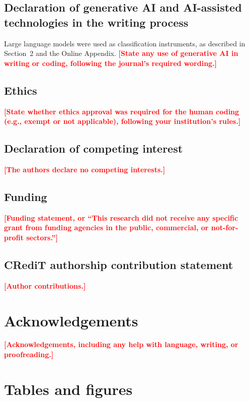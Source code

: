 \documentclass[12pt]{article}
\newcommand{\chk}[1]{\textcolor{red}{\textbf{[#1]}}}
\begin{document}
\subsection*{Declaration of generative AI and AI-assisted technologies in the writing process}
Large language models were used as classification instruments, as described in Section~2 and the Online Appendix. \chk{State any use of generative AI in writing or coding, following the journal's required wording.}

\subsection*{Ethics}
\chk{State whether ethics approval was required for the human coding (e.g., exempt or not applicable), following your institution's rules.}

\subsection*{Declaration of competing interest}
\chk{The authors declare no competing interests.}

\subsection*{Funding}
\chk{Funding statement, or ``This research did not receive any specific grant from funding agencies in the public, commercial, or not-for-profit sectors.''}

\subsection*{CRediT authorship contribution statement}
\chk{Author contributions.}

\section*{Acknowledgements}
\chk{Acknowledgements, including any help with language, writing, or proofreading.}




\clearpage
\section*{Tables and figures}
\end{document}
